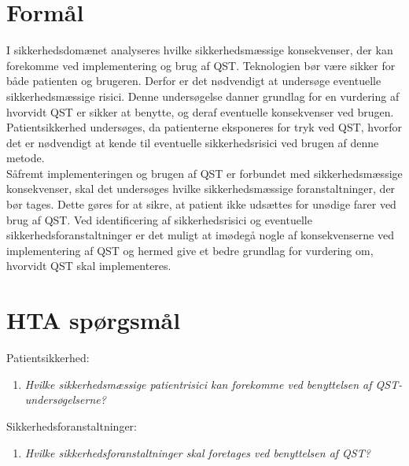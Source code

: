 \section{Formål} 
I sikkerhedsdomænet analyseres hvilke sikkerhedsmæssige konsekvenser, der kan forekomme ved implementering og brug af QST. Teknologien bør være sikker for både patienten og brugeren. Derfor er det nødvendigt at undersøge eventuelle sikkerhedsmæssige risici. Denne undersøgelse danner grundlag for en vurdering af hvorvidt QST er sikker at benytte, og deraf eventuelle konsekvenser ved brugen. \\
Patientsikkerhed undersøges, da patienterne eksponeres for tryk ved QST, hvorfor det er nødvendigt at kende til eventuelle sikkerhedsrisici ved brugen af denne metode. \\
Såfremt implementeringen og brugen af QST er forbundet med sikkerhedsmæssige konsekvenser, skal det undersøges hvilke sikkerhedsmæssige foranstaltninger, der bør tages. Dette gøres for at sikre, at patient ikke udsættes for unødige farer ved brug af QST. Ved identificering af sikkerhedsrisici og eventuelle sikkerhedsforanstaltninger er det muligt at imødegå nogle af konsekvenserne ved implementering af QST og hermed give et bedre grundlag for vurdering om, hvorvidt QST skal implementeres.

\section{HTA spørgsmål}
Patientsikkerhed:
\begin{enumerate}
\item \textit{Hvilke sikkerhedsmæssige patientrisici kan forekomme ved benyttelsen af QST-undersøgelserne?} %
\end{enumerate}
Sikkerhedsforanstaltninger:
\begin{enumerate}[resume]
\item \textit{Hvilke sikkerhedsforanstaltninger skal foretages ved benyttelsen af QST?}  %
\end{enumerate}


